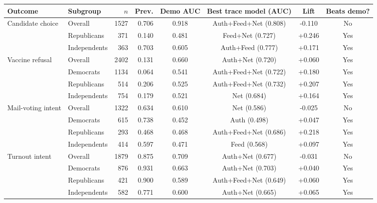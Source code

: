 \begin{tabular}{llrrcccc}
\toprule
Outcome & Subgroup & $n$ & Prev. & Demo AUC & Best trace model (AUC) & Lift & Beats demo? \\
\midrule
Candidate choice & Overall & 1527 & 0.706 & 0.918 & Auth+Feed+Net (0.808) & -0.110 & No \\
 & Republicans & 371 & 0.140 & 0.481 & Feed+Net (0.727) & +0.246 & Yes \\
 & Independents & 363 & 0.703 & 0.605 & Auth+Feed (0.777) & +0.171 & Yes \\
Vaccine refusal & Overall & 2402 & 0.131 & 0.660 & Auth+Net (0.720) & +0.060 & Yes \\
 & Democrats & 1134 & 0.064 & 0.541 & Auth+Feed+Net (0.722) & +0.180 & Yes \\
 & Republicans & 514 & 0.206 & 0.525 & Auth+Feed+Net (0.732) & +0.207 & Yes \\
 & Independents & 754 & 0.179 & 0.521 & Net (0.684) & +0.164 & Yes \\
Mail-voting intent & Overall & 1322 & 0.634 & 0.610 & Net (0.586) & -0.025 & No \\
 & Democrats & 615 & 0.738 & 0.452 & Auth (0.498) & +0.047 & Yes \\
 & Republicans & 293 & 0.468 & 0.468 & Auth+Feed+Net (0.686) & +0.218 & Yes \\
 & Independents & 414 & 0.597 & 0.471 & Feed (0.568) & +0.097 & Yes \\
Turnout intent & Overall & 1879 & 0.875 & 0.709 & Auth+Net (0.677) & -0.031 & No \\
 & Democrats & 876 & 0.931 & 0.663 & Auth+Net (0.703) & +0.040 & Yes \\
 & Republicans & 421 & 0.900 & 0.589 & Auth+Feed+Net (0.649) & +0.060 & Yes \\
 & Independents & 582 & 0.771 & 0.600 & Auth+Net (0.665) & +0.065 & Yes \\
\bottomrule
\end{tabular}